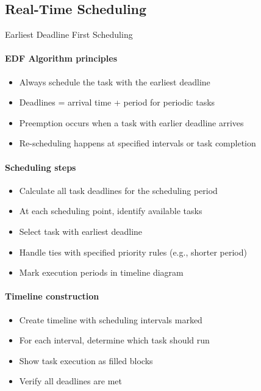 \subsection{Real-Time Scheduling}

\begin{KR}{Earliest Deadline First Scheduling}
    \paragraph{EDF Algorithm principles}
    \begin{itemize}
        \item Always schedule the task with the earliest deadline
        \item Deadlines = arrival time + period for periodic tasks
        \item Preemption occurs when a task with earlier deadline arrives
        \item Re-scheduling happens at specified intervals or task completion
    \end{itemize}
    
    \paragraph{Scheduling steps}
    \begin{itemize}
        \item Calculate all task deadlines for the scheduling period
        \item At each scheduling point, identify available tasks
        \item Select task with earliest deadline
        \item Handle ties with specified priority rules (e.g., shorter period)
        \item Mark execution periods in timeline diagram
    \end{itemize}
    
    \paragraph{Timeline construction}
    \begin{itemize}
        \item Create timeline with scheduling intervals marked
        \item For each interval, determine which task should run
        \item Show task execution as filled blocks
        \item Verify all deadlines are met
    \end{itemize}
\end{KR}

